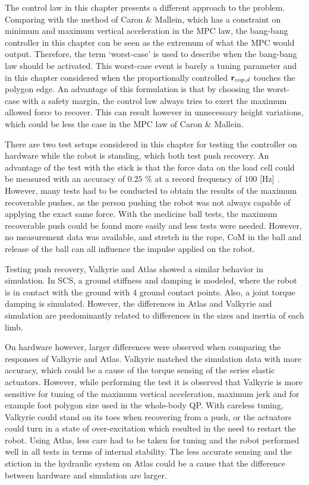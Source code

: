 The control law in this chapter presents a different approach to the problem. Comparing with the method of Caron \& Mallein, which has a constraint on minimum and maximum vertical acceleration in the \ac{MPC} law, the bang-bang controller in this chapter can be seen as the extremum of what the \ac{MPC} would output. Therefore, the term `worst-case' is used to describe when the bang-bang law should be activated. This worst-case event is barely a tuning parameter and in this chapter considered when the proportionally controlled $\mathbf{r}_{cop,d}$ touches the polygon edge. An advantage of this formulation is that by choosing the worst-case with a safety margin, the control law always tries to exert the maximum allowed force to recover. This can result however in unnecessary height variations, which could be less the case in the \ac{MPC} law of Caron \& Mallein.

There are two test setups considered in this chapter for testing the controller on hardware while the robot is standing, which both test push recovery. An advantage of the test with the stick is that the force data on the load cell could be measured with an accuracy of $0.25$ \% at a record frequency of $100$ [Hz] \cite{iload}. However, many tests had to be conducted to obtain the results of the maximum recoverable pushes, as the person pushing the robot was not always capable of applying the exact same force. With the medicine ball tests, the maximum recoverable push could be found more easily and less tests were needed. However, no measurement data was available, and stretch in the rope, \ac{CoM} in the ball and release of the ball can all influence the impulse  applied on the robot.

Testing push recovery, Valkyrie and Atlas showed a similar behavior in simulation. In \ac{SCS}, a ground stiffness and damping is modeled, where the robot is in contact with the ground with $4$ ground contact points. Also, a joint torque damping is simulated. However, the differences in Atlas and Valkyrie and simulation are predominantly related to differences in the sizes and inertia of each limb.

On hardware however, larger differences were observed when comparing the responses of Valkyrie and Atlas. Valkyrie matched the simulation data with more accuracy, which could be a cause of the torque sensing of the series elastic actuators. However, while performing the test it is observed that Valkyrie is more sensitive for tuning of the maximum vertical acceleration, maximum jerk and for example foot polygon size used in the whole-body \ac{QP}. With careless tuning, Valkyrie could stand on its toes when recovering from a push, or the actuators could turn in a state of over-excitation which resulted in the need to restart the robot. Using Atlas, less care had to be taken for tuning and the robot performed well in all tests in terms of internal stability. The less accurate sensing and the stiction in the hydraulic system on Atlas could be a cause that the difference between hardware and simulation are larger.

